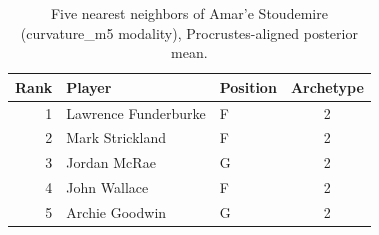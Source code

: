 \begin{table}[htbp]
  \centering\small
  \begin{tabular}{rllc}
    \toprule
    Rank & Player & Position & Archetype \\
    \midrule
    1 & Lawrence Funderburke & F & 2 \\
    2 & Mark Strickland & F & 2 \\
    3 & Jordan McRae & G & 2 \\
    4 & John Wallace & F & 2 \\
    5 & Archie Goodwin & G & 2 \\
    \bottomrule
  \end{tabular}
  \caption{Five nearest neighbors of Amar'e Stoudemire (curvature_m5 modality), Procrustes-aligned posterior mean.}
  \label{tab:Amar_e_Stoudemire_neighbors_curvature_m5}
\end{table}

